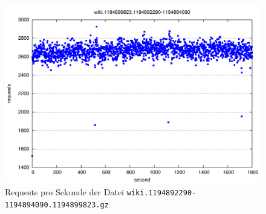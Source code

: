 \begin{figure}
  \centering
  \includegraphics[width=\textwidth]{images/trace-filtered}
  \caption{Requests pro Sekunde der Datei \texttt{wiki.1194892290-1194894090.1194899823.gz}}
  \label{fig:trace-filtered}
\end{figure}

